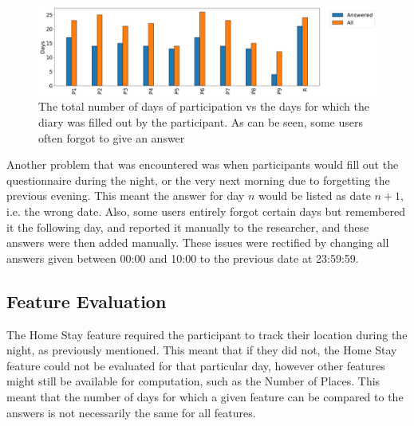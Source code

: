 \begin{figure}[h]
    \centering
    \includegraphics[width=\textwidth]{images/study/storage/answers_days_plot.png}
    \caption{The total number of days of participation vs the days for which the diary was filled out by the participant. As can be seen, some users often forgot to give an answer}
    \label{fig:plot-days-answered}
\end{figure}

Another problem that was encountered was when participants would fill out the questionnaire during the night, or the very next morning due to forgetting the previous evening. This meant the answer for day $n$ would be listed as date $n+1$, i.e. the wrong date.  Also, some users entirely forgot certain days but remembered it the following day, and reported it manually to the researcher, and these answers were then added manually. These issues were rectified by changing all answers given between 00:00 and 10:00 to the previous date at 23:59:59.

\subsection{Feature Evaluation}
The Home Stay feature required the participant to track their location during the night, as previously mentioned. This meant that if they did not, the Home Stay feature could not be evaluated for that particular day, however other features might still be available for computation, such as the Number of Places. This meant that the number of days for which a given feature can be compared to the answers is not necessarily the same for all features. \\

